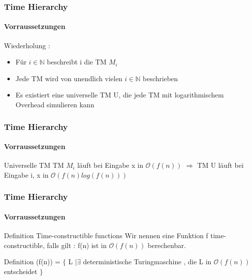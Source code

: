 \begin{frame}
	\frametitle{Time Hierarchy}
	\framesubtitle{Vorraussetzungen}
	Wiederholung :
	\begin{itemize}[<+->]
		\item Für $i\in \mathbb{N}$ beschreibt i die TM $M_i$
		\item Jede TM wird von unendlich vielen $i\in \mathbb{N}$ beschrieben
		\item Es existiert eine universelle TM U, die jede TM mit logarithmischem Overhead 					simulieren kann
	\end{itemize}
\end{frame}
\begin{frame}
	\frametitle{Time Hierarchy}
	\framesubtitle{Vorraussetzungen}
	\begin{KITexampleblock}{Universelle TM}
	TM $M_i$ läuft bei Eingabe x in $\mathcal{O}(f(n))$
	$\Rightarrow$ TM U läuft bei Eingabe i, x in $\mathcal{O}(f(n)log(f(n)))$
	\end{KITexampleblock}
\end{frame}
\begin{frame}
	\frametitle{Time Hierarchy}
	\framesubtitle{Vorraussetzungen}
	\begin{KITinfoblock}{Definition Time-constructible functions}
		Wir nennen eine Funktion f time-constructible, falls gilt : \newline
		f(n) ist in $\mathcal{O}(f(n))$ berechenbar. 
	\end{KITinfoblock}
	
	\bigskip
	\pause	
	
	\begin{KITinfoblock}{Definition \DTIME }
		\DTIME(f(n)) = $\lbrace$ L $\vert \exists$ deterministische Turingmaschine ,
		 die L in $\mathcal{O}(f(n))$ entscheidet $\rbrace$
	\end{KITinfoblock}
\end{frame}
